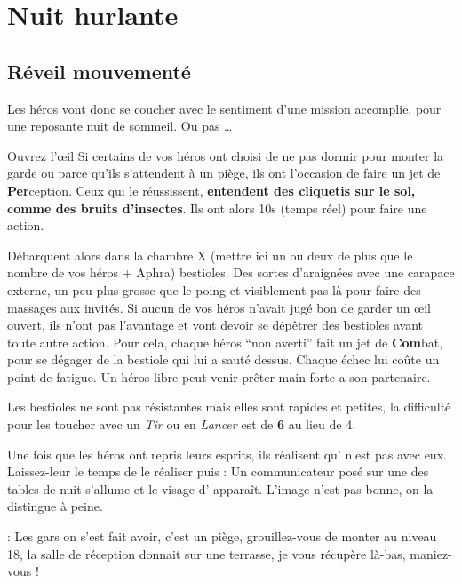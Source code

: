 \section{Nuit hurlante}

\subsection{Réveil mouvementé}

Les héros vont donc se coucher avec le sentiment d’une mission accomplie, pour une reposante nuit de sommeil. Ou pas \dots

\begin{paperbox}{Ouvrez l’œil}
Si certains de vos héros ont choisi de ne pas dormir pour monter la garde ou parce qu’ils s’attendent à un piège, ils ont l’occasion de faire un jet de \textbf{Per}ception. Ceux qui le réussissent, \textbf{entendent des cliquetis sur le sol, comme des bruits d’insectes}. Ils ont alors 10s (temps réel) pour faire une action.
\end{paperbox}

Débarquent alors dans la chambre X (mettre ici un ou deux de plus que le nombre de vos héros + Aphra) bestioles. Des sortes d’araignées avec une carapace externe, un peu plus grosse que le poing et visiblement pas là pour faire des massages aux invités. Si aucun de vos héros n’avait jugé bon de garder un œil ouvert, ils n’ont pas l’avantage et vont devoir se dépêtrer des bestioles avant toute autre action. Pour cela, chaque héros “non averti” fait un jet de \textbf{Com}bat, pour se dégager de la bestiole qui lui a sauté dessus. Chaque échec lui coûte un point de fatigue. Un héros libre peut venir prêter main forte a son partenaire.

Les bestioles ne sont pas résistantes mais elles sont rapides et petites, la difficulté pour les toucher avec un \textit{Tir} ou en \textit{Lancer} est de \textbf{6} au lieu de 4.

Une fois que les héros ont repris leurs esprits, ils réalisent qu’ n’est pas avec eux. Laissez-leur le temps de le réaliser puis : Un communicateur posé sur une des tables de nuit s’allume et le visage d’ apparaît. L’image n’est pas bonne, on la distingue à peine.

\begin{quotebox}
\noindent\textbf{}: Les gars on s’est fait avoir, c’est un piège, grouillez-vous de monter au niveau 18, la salle de réception donnait sur une terrasse, je vous récupère là-bas, maniez-vous !
\end{quotebox}

